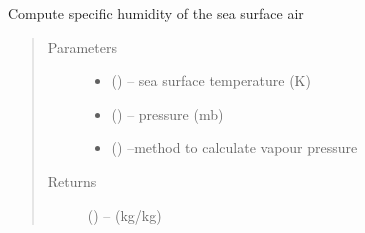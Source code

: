 \documentclass[letterpaper,10pt,english]{sphinxmanual}
\begin{document}

\begin{fulllineitems}
\label{\detokenize{index:hum_subs.qsat_sea}}
Compute specific humidity of the  sea surface air

\begin{quote}\begin{description}
\item[{Parameters}] \leavevmode\begin{itemize}
\item {} 
 (\href{https://docs.python.org/3/library/functions.html\#float}{}) -- sea surface temperature (K)

\item {} 
 (\href{https://docs.python.org/3/library/functions.html\#float}{}) -- pressure (mb)

\item {} 
 (\href{https://docs.python.org/3/library/functions.html\#str}{}) --method to calculate vapour pressure

\end{itemize}

\item[{Returns}] \leavevmode
{} (\href{https://docs.python.org/3/library/functions.html\#float}{}) -- (kg/kg)

\end{description}\end{quote}

\end{fulllineitems}

\end{document}

